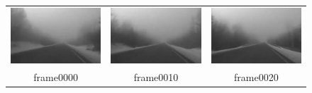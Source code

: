 \documentclass[12pt]{report}
\begin{document}
\newcommand{\videoScale}{0.5}
\begin{figure}[H]
\centering
\begin{tabular}{ccc}
	\includegraphics[scale=\videoScale]{images/frame0000.jpg} & \includegraphics[scale=\videoScale]{images/frame0010.jpg} & \includegraphics[scale=\videoScale]{images/frame0020.jpg}\\
	frame0000 & frame0010 & frame0020 \\

\end{tabular}
\end{figure}
\end{document}
